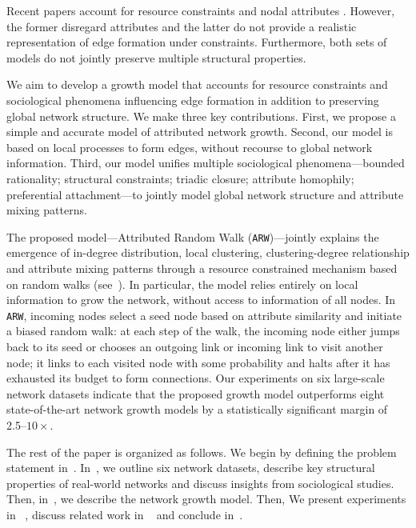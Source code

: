 Recent papers account for resource constraints
\cite{mossa2002truncation,zeng2005construction,wang2009local} and nodal
attributes \cite{de2013scale,gong2012evolution}. However, the former disregard
attributes and the latter do not provide a realistic representation of edge
formation under constraints. Furthermore, both sets of models do not
jointly preserve multiple structural properties.

We aim to develop a growth model that accounts for resource constraints and sociological phenomena
influencing edge formation in addition to preserving global network structure.
We make three key contributions.
First, we propose a simple and accurate model of attributed network growth.
Second, our model is based on local processes to form edges, without recourse to global network information.
Third, our model unifies multiple sociological phenomena---bounded rationality; structural constraints; triadic closure; attribute homophily; preferential attachment---to jointly  model global network structure and attribute mixing patterns.


The proposed model---Attributed Random Walk (\texttt{ARW})---jointly explains
the emergence of in-degree distribution, local clustering, clustering-degree
relationship and attribute mixing patterns through a resource constrained
mechanism based on random walks (see~). In particular,
the model relies entirely on local information to grow the network, without
access to information of all nodes. In \texttt{ARW}, incoming nodes select a
seed node based on attribute similarity and initiate a biased random walk: at
each step of the walk, the incoming node either jumps back to its seed or
chooses an outgoing link or incoming link to visit another node; it links to
each visited node with some probability and halts after it has exhausted its
budget to form connections.
Our experiments on six large-scale network datasets indicate that the proposed growth model outperforms
eight state-of-the-art network growth models by a
statistically significant margin of 2.5--$10\times$.


The rest of the paper is organized as follows.
We begin by defining the problem statement in~.
In~, we outline six network datasets, describe key structural
properties of real-world networks and discuss insights from sociological studies.
Then, in~, we describe the network growth model. Then, We
present experiments in ~, discuss related work in ~ and conclude in~.
